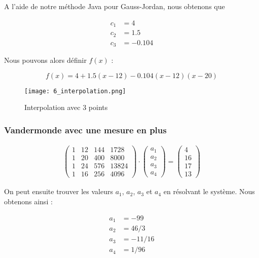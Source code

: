A l'aide de notre méthode Java pour Gauss-Jordan, nous obtenons que 

\begin{equation}
	\begin{aligned}
		c_1 &= 4\\
		c_2 &= 1.5\\
		c_3 &= -0.104
	\end{aligned}
\end{equation}

Nous pouvons alors définir $f(x)$ :

\begin{equation}
	f(x) = 4 + 1.5(x-12) - 0.104(x-12)(x-20)
\end{equation}


\begin{figure}[H]
	\centering
	\caption{\label{3pts} Interpolation avec 3 points}
	\texttt{[image: 6\_interpolation.png]}
\end{figure}

\subsubsection{Vandermonde avec une mesure en plus}

\begin{equation}
	\begin{aligned}
		\begin{pmatrix}
			1 & 12 & 144 & 1728\\
			1 & 20 & 400 & 8000\\
			1 & 24 & 576 & 13824\\
			1 & 16 & 256 & 4096
		\end{pmatrix}
		\cdot
		\begin{pmatrix}
			a_1\\
			a_2\\
			a_3\\
			a_4
		\end{pmatrix}
		=
		\begin{pmatrix}
			4\\
			16\\
			17\\
			13
		\end{pmatrix}
	\end{aligned}
\end{equation}

On peut ensuite trouver les valeurs $a_1$, $a_2$, $a_3$ et $a_4$ en résolvant le système. Nous obtenons ainsi :

\begin{equation}
	\begin{aligned}
		a_1 &= -99\\
		a_2 &= 46/3\\
		a_3 &= -11/16\\
		a_4 &= 1/96
	\end{aligned}
\end{equation}


